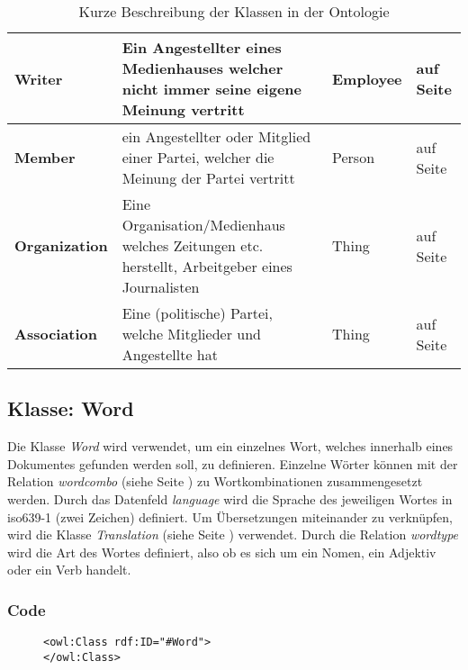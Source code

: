\documentclass[
    11pt,
    latin1,
    a4paper,
    oneside
]{scrreprt}
\begin{document}
\begin{table}[h]
\begin{tabular}{ | l | p{4cm} | l | l| }
		\textbf{Writer} & Ein Angestellter eines Medienhauses welcher nicht immer seine eigene Meinung vertritt & Employee & \nameref{sec:class_writer} auf Seite \pageref{sec:class_writer} \\ \hline
		\textbf{Member} & ein Angestellter oder Mitglied einer Partei, welcher die Meinung der Partei vertritt & Person & \nameref{sec:class_member} auf Seite \pageref{sec:class_member} \\ \hline
		\textbf{Organization} & Eine Organisation/Medienhaus welches Zeitungen etc. herstellt, Arbeitgeber eines Journalisten & Thing & \nameref{sec:class_organization} auf Seite \pageref{sec:class_organization} \\ \hline
		\textbf{Association} & Eine (politische) Partei, welche Mitglieder und Angestellte hat & Thing & \nameref{sec:class_association} auf Seite \pageref{sec:class_association} \\ \hline
	\end{tabular}
	\caption{Kurze Beschreibung der Klassen in der Ontologie}
	\label{tbl:classes}
\end{table}


\subsection{Klasse: Word} \label{sec:class_word}

Die Klasse \emph{Word} wird verwendet, um ein einzelnes Wort, welches innerhalb eines Dokumentes gefunden werden soll, zu definieren. Einzelne W\"orter k\"onnen mit der Relation \emph{wordcombo} (siehe  Seite \pageref{sec:rel_wordcombo}) zu Wortkombinationen zusammengesetzt werden. Durch das Datenfeld \emph{language} wird die Sprache des jeweiligen Wortes in iso639-1 (zwei Zeichen) definiert. Um \"Ubersetzungen miteinander zu verknüpfen, wird die Klasse \emph{Translation} (siehe  Seite \pageref{sec:class_translation}) verwendet. Durch die Relation \emph{wordtype} wird die Art des Wortes definiert, also ob es sich um ein Nomen, ein Adjektiv oder ein Verb handelt.

\subsubsection{Code}  \label{sec:class_word_code}

\begin{figure}[h]
 \lstset{language=XML}
 \begin{lstlisting}[label=owl:word]
<owl:Class rdf:ID="#Word">
</owl:Class>
 \end{lstlisting}
\end{figure}
\end{document}
